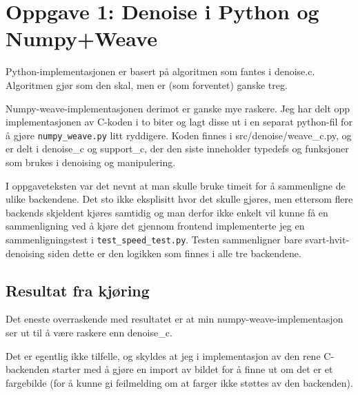 \section*{Oppgave 1: Denoise i Python og Numpy+Weave}

Python-implementasjonen er basert på algoritmen som fantes i denoise.c. Algoritmen gjør som den skal, men er (som forventet) ganske treg.

Numpy-weave-implementasjonen derimot er ganske mye raskere. Jeg har delt opp implementasjonen av C-koden i to biter og lagt disse ut i en separat python-fil for å gjøre \verb;numpy_weave.py; litt ryddigere. Koden finnes i src/denoise/weave\_c.py, og er delt i denoise\_c og support\_c, der den siste inneholder typedefs og funksjoner som brukes i denoising og manipulering.

I oppgaveteksten var det nevnt at man skulle bruke timeit for å sammenligne de ulike backendene. Det sto ikke eksplisitt hvor det skulle gjøres, men ettersom flere backends skjeldent kjøres samtidig og man derfor ikke enkelt vil kunne få en sammenligning ved å kjøre det gjennom frontend implementerte jeg en sammenligningstest i \verb;test_speed_test.py;. Testen sammenligner bare svart-hvit-denoising siden dette er den logikken som finnes i alle tre backendene.

\subsection*{Resultat fra kjøring}

Det eneste overraskende med resultatet er at min numpy-weave-implementasjon ser ut til å være raskere enn denoise\_c.

Det er egentlig ikke tilfelle, og skyldes at jeg i implementasjon av den rene C-backenden starter med å gjøre en import av bildet for å finne ut om det er et fargebilde (for å kunne gi feilmelding om at farger ikke støttes av den backenden).